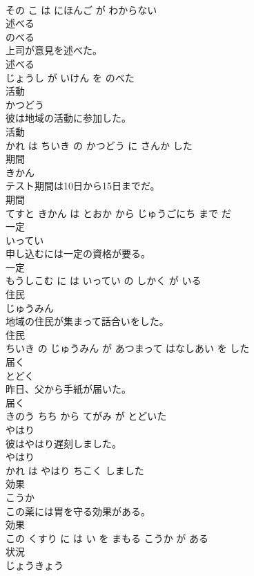 \documentclass[8pt]{extreport}
\begin{document}
\begin{CJK}{UTF8}{min}
\\	その こ は にほんご が わからない			
\\	述べる	
\\	のべる			
\\	上司が意見を述べた。	
\\	述べる 
\\	じょうし が いけん を のべた			
\\	活動	
\\	かつどう			
\\	彼は地域の活動に参加した。	
\\	活動 
\\	かれ は ちいき の かつどう に さんか した			
\\	期間	
\\	きかん			
\\	テスト期間は10日から15日までだ。	
\\	期間 
\\	てすと きかん は とおか から じゅうごにち まで だ			
\\	一定	
\\	いってい			
\\	申し込むには一定の資格が要る。	
\\	一定 
\\	もうしこむ に は いってい の しかく が いる			
\\	住民	
\\	じゅうみん			
\\	地域の住民が集まって話合いをした。	
\\	住民 
\\	ちいき の じゅうみん が あつまって はなしあい を した			
\\	届く	
\\	とどく			
\\	昨日、父から手紙が届いた。	
\\	届く 
\\	きのう ちち から てがみ が とどいた			
\\	やはり	
\\	彼はやはり遅刻しました。	
\\	やはり 
\\	かれ は やはり ちこく しました			
\\	効果	
\\	こうか			
\\	この薬には胃を守る効果がある。	
\\	効果 
\\	この くすり に は い を まもる こうか が ある			
\\	状況	
\\	じょうきょう			

\end{CJK}
\end{document}

